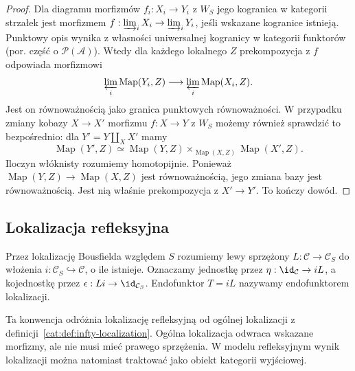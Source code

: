 \begin{proof}
Dla diagramu morfizmów $f_i:X_i\to Y_i$ z $W_S$ jego kogranica w kategorii strzałek jest morfizmem $f:\varinjlim_i X_i\to\varinjlim_iY_i$, jeśli wskazane kogranice istnieją. Punktowy opis wynika z własności uniwersalnej kogranicy w kategorii funktorów (por. część o $\mathcal P(\mathcal A)$). Wtedy dla każdego lokalnego $Z$ prekompozycja z $f$ odpowiada morfizmowi
\[
 \varprojlim_i\operatorname{Map}(Y_i,Z)\longrightarrow
 \varprojlim_i\operatorname{Map}(X_i,Z).
\]
Jest on równoważnością jako granica punktowych równoważności. W przypadku zmiany kobazy $X\to X'$ morfizmu $f:X\to Y$ z $W_S$ możemy również sprawdzić to bezpośrednio: dla $Y'=Y\amalg_X X'$ mamy
\[
 \operatorname{Map}(Y',Z)\simeq
 \operatorname{Map}(Y,Z)\times_{\operatorname{Map}(X,Z)}
 \operatorname{Map}(X',Z).
\]
Iloczyn włóknisty rozumiemy homotopijnie. Ponieważ $\operatorname{Map}(Y,Z)\to\operatorname{Map}(X,Z)$ jest równoważnością, jego zmiana bazy jest równoważnością. Jest nią właśnie prekompozycja z $X'\to Y'$. To kończy dowód.
\end{proof}

\subsection{Lokalizacja refleksyjna}

\begin{definicja}\label{cat:def:infty-bousfield-reflection}
Przez lokalizację Bousfielda względem $S$ rozumiemy lewy sprzężony $L:\mathcal C\to\mathcal C_S$ do włożenia $i:\mathcal C_S\hookrightarrow\mathcal C$, o ile istnieje. Oznaczamy jednostkę przez $\eta:\id_{\mathcal C}\to iL$, a kojednostkę przez $\epsilon:Li\to\id_{\mathcal C_S}$. Endofunktor $T=iL$ nazywamy endofunktorem lokalizacji.
\end{definicja}

Ta konwencja odróżnia lokalizację refleksyjną od ogólnej lokalizacji z definicji~\ref{cat:def:infty-localization}. Ogólna lokalizacja odwraca wskazane morfizmy, ale nie musi mieć prawego sprzężenia. W modelu refleksyjnym wynik lokalizacji można natomiast traktować jako obiekt kategorii wyjściowej.

